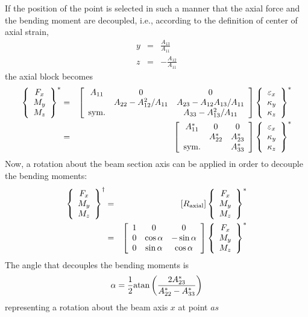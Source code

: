 If the position of the point is selected in such a manner 
that the axial force and the bending moment are decoupled, i.e.,
according to the definition of center of axial strain,
\begin{eqnarray*}
	y & = & \frac{A_{13}}{A_{11}} \\
	z & = & -\frac{A_{12}}{A_{11}}
\end{eqnarray*}
the axial block becomes
\begin{eqnarray*}
	\cubr{\cvvect{
		F_x \\
		M_y \\
		M_z
	}}^*
	& = &
	\sqbr{\matr{ccc}{
		A_{11} & 0 & 0 \\
		& A_{22} - A_{12}^2/A_{11} & A_{23} - A_{12}A_{13}/A_{11} \\
		\llk{sym.} &  & A_{33} - A_{13}^2/A_{11}
	}}\cubr{\cvvect{
		\varepsilon_x \\
		\kappa_y \\
		\kappa_z
	}}^*
	\\
	& = &
	\sqbr{\matr{ccc}{
		A_{11}^* & 0 & 0 \\
		& A_{22}^* & A_{23}^* \\
		\llk{sym.} &  & A_{33}^*
	}}\cubr{\cvvect{
		\varepsilon_x \\
		\kappa_y \\
		\kappa_z
	}}^*
\end{eqnarray*}
Now, a rotation about the beam section axis can be applied 
in order to decouple the bending moments:
\begin{eqnarray}
	\cubr{\cvvect{
		F_x \\
		M_y \\
		M_z
	}}^{\dagger}
	& = & \sqbr{R_{\llk{axial}}}\cubr{\cvvect{
		F_x \\
		M_y \\
		M_z
	}}^*
	\nonumber \\
	& = & \sqbr{\matr{ccc}{
		 1 & 0 & 0 \\
		 0 & \cos\alpha & -\sin\alpha \\
		 0 & \sin\alpha & \cos\alpha
	}}\cubr{\cvvect{
		F_x \\
		M_y \\
		M_z
	}}^*
	\label{eq:EL:BEAM:AXIAL-ROTATION}
\end{eqnarray}
The angle that decouples the bending moments is
\begin{equation*}
	\alpha = \frac{1}{2}\llk{atan}\plbr{\frac{2 A_{23}^*}{A_{22}^* - A_{33}^*}}
\end{equation*}
representing a rotation about the beam axis $x$ at point $as$
